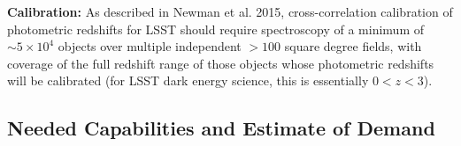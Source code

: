 {\bf Calibration:} As described in Newman et al. 2015,  cross-correlation calibration of photometric redshifts for LSST should require spectroscopy of a minimum of $\sim 5 \times 10^4$ objects over multiple independent $>100$ square degree fields, with coverage of the full redshift range of those objects whose photometric redshifts will be calibrated (for LSST dark energy science, this is essentially $0<z<3$).



\subsection{Needed Capabilities and Estimate of Demand}


